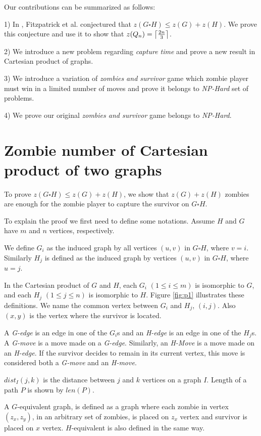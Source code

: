 \documentclass[1p]{elsarticle}
\DeclarePairedDelimiter\ceil{\lceil}{\rceil} \DeclarePairedDelimiter\floor{\lfloor}{\rfloor}
\begin{document}
Our contributions can be summarized as follows:

1) In \cite{Fitz16}, Fitzpatrick et al. conjectured that $z(G \square H) \leq z(G) + z(H)$. We prove this conjecture and
use it to show that $z(Q_n) = \ceil*{\frac{2n}{3}}$. 

2) We introduce a new problem regarding {\it capture time} and prove a new result in Cartesian product of graphs.

3) We introduce a variation of {\it zombies and survivor} game which zombie player must win in a limited number of
moves and prove it belongs to {\it NP-Hard} set of problems.

4) We prove our original {\it zombies and survivor} game belongs to {\it NP-Hard}.


\section{Zombie number of Cartesian product of two graphs}\label{conj-proof}

To prove $z(G \square H) \leq z(G) + z(H)$, we show that $z(G) + z(H)$ zombies are enough for the zombie player to
capture the survivor on $G \square H$.

To explain the proof we first need to define some notations. Assume $H$ and $G$ have $m$ and $n$ vertices,
respectively. 

We define $G_{i}$ as the induced graph by all vertices $(u,v)$ in $G \square H$, where $v=i$. Similarly
$H_{j}$ is defined as the induced graph by vertices $(u,v)$ in $G \square H$, where $u=j$.

In the Cartesian product of $G$ and $H$, each $G_{i}$ $(1 \leq i \leq m)$ is isomorphic to $G$, and each $H_{j}$ $(1
\leq j \leq n)$ is isomorphic to $H$. Figure \ref{fig:p1} illustrates these definitions. We name the common vertex
between $G_{i}$ and $H_{j}$, $(i,j)$. Also $(x,y)$ is the vertex where the survivor is located. 

A {\it G-edge} is an edge in one of the $G_{i}$s and an {\it H-edge} is an edge in one of the $H_{j}$s. A {\it G-move}
is a move made on a {\it G-edge}. Similarly, an {\it H-Move} is a move made on an {\it H-edge}. If the survivor decides
to remain in its current vertex, this move is considered both a {\it G-move} and an {\it H-move}. 

$dist_I(j,k)$ is the distance between $j$ and $k$ vertices on a graph $I$. Length of a path $P$ is shown by $len(P)$. 

A $G$-equivalent graph, is defined as a graph where each zombie in vertex $(z_x,z_y)$, in an arbitrary set of zombies,
is placed on $z_x$ vertex and survivor is placed on $x$ vertex. $H$-equivalent is also defined in the same way. 
\end{document}
